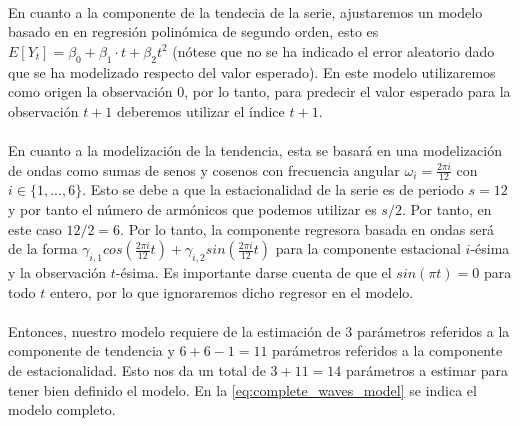 \documentclass[a4paper, spanish]{article}
\begin{document}
    \paragraph{}
    En cuanto a la componente de la tendecia de la serie, ajustaremos un modelo basado en en regresión polinómica de segundo orden, esto es $E[Y_t] = \beta_0 + \beta_1 \cdot t + \beta_2 t ^ 2$ (nótese que no se ha indicado el error aleatorio dado que se ha modelizado respecto del valor esperado). En este modelo utilizaremos como origen la observación $0$, por lo tanto, para predecir el valor esperado para la observación $t + 1$ deberemos utilizar el índice $t + 1$.

    \paragraph{}
    En cuanto a la modelización de la tendencia, esta se basará en una modelización de ondas como sumas de senos y cosenos con frecuencia angular $\omega_i = \frac{2 \pi i}{12}$ con $i \in \{1, ..., 6\}$. Esto se debe a que la estacionalidad de la serie es de periodo $s = 12$ y por tanto el número de armónicos que podemos utilizar es $s / 2$. Por tanto, en este caso $12 / 2 = 6$. Por lo tanto, la componente regresora basada en ondas será de la forma $\gamma_{i,1} cos\left(\frac{2 \pi  i}{12} t\right) + \gamma_{i,2} sin\left(\frac{2 \pi i}{12} t\right)$ para la componente estacional $i$-ésima y la observación $t$-ésima. Es importante darse cuenta de que el $sin(\pi t) = 0$ para todo $t$ entero, por lo que ignoraremos dicho regresor en el modelo.

    \paragraph{}
    Entonces, nuestro modelo requiere de la estimación de $3$ parámetros referidos a la componente de tendencia y $6 + 6 -1 = 11$ parámetros referidos a la componente de estacionalidad. Esto nos da un total de $3 + 11 = 14$ parámetros a estimar para tener bien definido el modelo. En la \autoref{eq:complete_waves_model} se indica el modelo completo.
\end{document}
